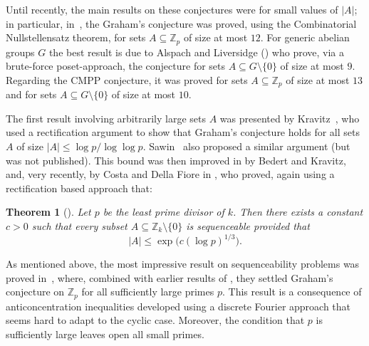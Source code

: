 \documentclass[11pt]{amsart}
\newtheorem{theorem}{Theorem}[section]
\theoremstyle{definition}
\begin{document}
Until recently, the main results on these conjectures were for small values of $|A|$;
in particular, in~\cite{CDOR}, the Graham's conjecture was proved, using the Combinatorial Nullstellensatz theorem, for sets $A\subseteq \mathbb{Z}_p$ of size at most $12$.
For generic abelian groups $G$ the best result is due to Alspach and Liversidge (\cite{AL20}) who prove, via a brute-force poset-approach, the conjecture for sets $A\subseteq G\setminus\{0\}$ of size at most $9$. 
Regarding the CMPP conjecture, it was proved for sets $A\subseteq \mathbb{Z}_p$ of size at most $13$ and for sets $A\subseteq G\setminus\{0\}$ of size at most $10$.

The first result involving arbitrarily large sets $A$ was presented by Kravitz~\cite{NK},
who used a rectification argument to show that Graham's conjecture holds for all sets $A$ of size
$|A|\le \log p/\log\log p$. %
Sawin~\cite{Sawin} also proposed a similar argument (but was not published). This bound was then improved in \cite{BK} by Bedert and Kravitz, and, very recently, by Costa and Della Fiore in \cite{CD26}, who proved, again using a rectification based approach that:
\begin{theorem}[\cite{CD26}]\label{thm:mainBK}
Let $p$ be the least prime divisor of $k$. Then there exists a constant $c>0$ such that every subset $A \subseteq \mathbb{Z}_k \setminus\{0\}$
is sequenceable provided that
\[
|A| \leq \exp\!\big(c(\log p)^{1/3}\big).
\]
\end{theorem}

As mentioned above, the most impressive result on sequenceability problems was proved in~\cite{PM}, where, combined with earlier results of \cite{BBKMM}, they settled Graham's conjecture on $\mathbb{Z}_p$ for all sufficiently large primes $p$. This result is a consequence of anticoncentration inequalities developed using a discrete Fourier approach that seems hard to adapt to the cyclic case. Moreover, the condition that $p$ is sufficiently large leaves open all small primes.
\end{document}
